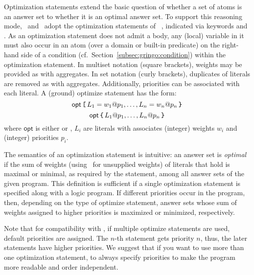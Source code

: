 Optimization statements extend the basic question of
whether a set of atoms is an answer set to
whether it is an optimal answer set.
To support this reasoning mode, \gringo\ and \clingo\ adopt the
optimization statements of \lparse~\cite{lparseManual},
indicated via keywords  and .
As an optimization statement does not admit a body, any (local) variable
in it must also occur in an atom (over a domain or built-in predicate)
on the right-hand side of a condition (cf.\ Section~\ref{subsec:gringo:condition})
within the optimization statement.
In multiset notation (square brackets),
weights may be provided as with  aggregates. %
In set notation (curly brackets),
duplicates of literals are removed
as with  aggregates.
Additionally, priorities can be associated with each literal.
A (ground) optimize statement has the form: 
%
%
\[\mathsf{opt}\,\code{[}\,L_1=w_1@p_1,\dots,L_n=w_n@p_n\,\code{\char`\}}\] 
\[\mathsf{opt}\,\code{\char`\{}\,L_1@p_1,\dots,L_n@p_n\,\code{\char`\}}\]
where $\mathsf{opt}$ is either  or  , $L_i$ are literals 
with associates (integer) weights $w_i$ and (integer) priorities $p_i$.

The semantics of an optimization statement is intuitive:
an answer set is \emph{optimal} if the sum of weights
(using~ for unsupplied weights)
of literals that hold is maximal or minimal, as required by the statement,
among all answer sets of the given program.
This definition is sufficient if a single optimization statement is specified
along with a logic program.
If different priorities occur in the program, 
then, depending on the type of optimize statement,
answer sets whose sum of weights assigned to higher priorities
is maximized or minimized, respectively.

Note that for compatibility with \lparse, if multiple optimize statements are used, 
default priorities are assigned.
The $n$-th statement gets priority $n$, thus, the later statements have higher priorities.
We suggest that if you want to use more than one optimization statement,
to always specify priorities to make the program more readable and order independent.

